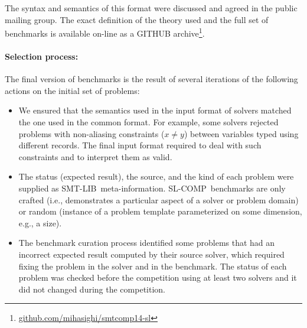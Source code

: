\documentclass[twoside,11pt]{article}
\newcommand{\smtlib}{\textsf{SMT-LIB}}
\newcommand{\slcomp}{\textsf{SL-COMP}}
\begin{document}
The syntax and semantics of this format were discussed and agreed in the public mailing group. 
The exact definition of the theory used and the full set of benchmarks is available on-line as a GITHUB archive\footnote{\url{github.com/mihasighi/smtcomp14-sl}}.

\paragraph{Selection process:} The final version of benchmarks is the result of several iterations of the following actions on the initial set of problems:
\begin{itemize}
\item We ensured that the semantics used in the input format of solvers matched the one used in the common format. 
For example, some solvers rejected problems with non-aliasing constraints ($x\neq y$) between variables typed using different records. The final input format required to deal with such constraints and to interpret them as valid.

\item The status (expected result), the source, and the kind of each problem were supplied as \smtlib\ meta-information.
\slcomp\ benchmarks are only crafted (i.e., demonstrates a particular aspect of a solver or problem domain) or
random (instance of a problem template parameterized on some dimension, e.g., a size).

\item The benchmark curation process identified some problems that had an incorrect expected result computed by their source solver, which required fixing the problem in the solver and in the benchmark.
The status of each problem was checked before the competition using at least two solvers and it did not changed during the competition. 
\end{itemize}
\end{document}
